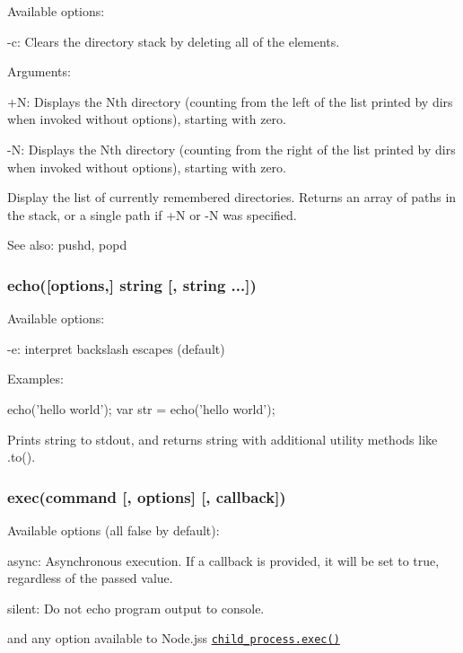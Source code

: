 Available options\+:


\begin{DoxyItemize}
\item {\ttfamily -\/c}\+: Clears the directory stack by deleting all of the elements.
\end{DoxyItemize}

Arguments\+:


\begin{DoxyItemize}
\item {\ttfamily +N}\+: Displays the Nth directory (counting from the left of the list printed by dirs when invoked without options), starting with zero.
\item {\ttfamily -\/N}\+: Displays the Nth directory (counting from the right of the list printed by dirs when invoked without options), starting with zero.
\end{DoxyItemize}

Display the list of currently remembered directories. Returns an array of paths in the stack, or a single path if +N or -\/N was specified.

See also\+: pushd, popd

\subsubsection*{echo(\mbox{[}options,\mbox{]} string \mbox{[}, string ...\mbox{]})}

Available options\+:


\begin{DoxyItemize}
\item {\ttfamily -\/e}\+: interpret backslash escapes (default)
\end{DoxyItemize}

Examples\+:


\begin{DoxyCode}
echo('hello world');
var str = echo('hello world');
\end{DoxyCode}


Prints string to stdout, and returns string with additional utility methods like {\ttfamily .to()}.

\subsubsection*{exec(command \mbox{[}, options\mbox{]} \mbox{[}, callback\mbox{]})}

Available options (all {\ttfamily false} by default)\+:


\begin{DoxyItemize}
\item {\ttfamily async}\+: Asynchronous execution. If a callback is provided, it will be set to {\ttfamily true}, regardless of the passed value.
\item {\ttfamily silent}\+: Do not echo program output to console.
\item and any option available to Node.\+js\textquotesingle{}s \href{https://nodejs.org/api/child_process.html#child_process_child_process_exec_command_options_callback}{\tt child\+\_\+process.\+exec()}
\end{DoxyItemize}


